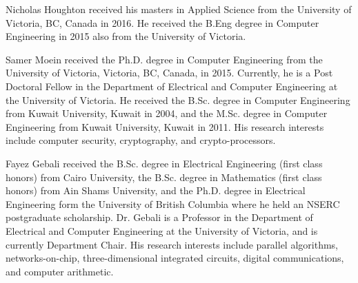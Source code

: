 \documentclass[journal, hidelinks]{IEEEtran}
\begin{document}



\begin{IEEEbiography}{Nicholas Houghton}
received his masters in Applied Science from the University of Victoria, BC, Canada in 2016.
He received the B.Eng degree in Computer Engineering in 2015 also from the University of Victoria.
\end{IEEEbiography}



\begin{IEEEbiography}{Samer Moein}
received the Ph.D. degree in Computer Engineering from the University
of Victoria, Victoria, BC, Canada, in 2015.
Currently, he is a Post Doctoral Fellow in the Department of Electrical and Computer
Engineering at the University of Victoria.
He received the B.Sc. degree in Computer
Engineering from Kuwait University, Kuwait in 2004, and the M.Sc.
degree in Computer Engineering from Kuwait University, Kuwait in 2011.
His research interests include computer security, cryptography, and crypto-processors.
\end{IEEEbiography}


\begin{IEEEbiography}{Fayez Gebali}
received the B.Sc. degree in Electrical Engineering (first class honors) from Cairo University,
the B.Sc. degree in Mathematics (first class honors) from Ain Shams University,
and the Ph.D. degree in Electrical Engineering form the University of British Columbia where he held an NSERC postgraduate scholarship.
Dr. Gebali is a Professor in the Department of Electrical and Computer Engineering at the University of Victoria,
and is currently Department Chair.
His research interests include parallel algorithms, networks-on-chip, three-dimensional integrated circuits, digital communications, and computer arithmetic.
\end{IEEEbiography}
\end{document}
